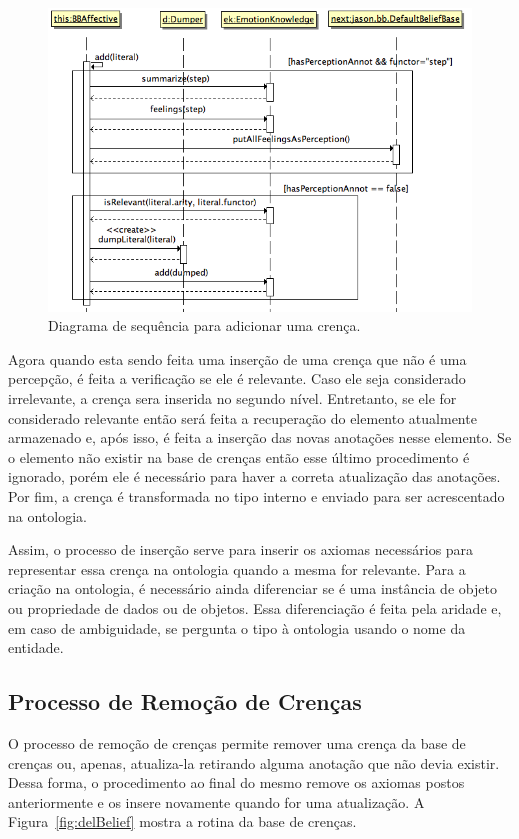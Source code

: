 \begin{figure}
  \centering
  \includegraphics[width=12cm]{figuras/addB.png}
  \caption{Diagrama de sequência para adicionar uma crença.}
  \label{fig:addBelief}
\end{figure}

Agora quando esta sendo feita uma inserção de uma crença que não é uma
percepção, é feita a verificação se ele é relevante. Caso ele seja considerado
irrelevante, a crença sera inserida no segundo nível. Entretanto, se ele for
considerado relevante então será feita a recuperação do elemento atualmente
armazenado e, após isso, é feita a inserção das novas anotações nesse
elemento. Se o elemento não existir na base de crenças então esse último
procedimento é ignorado, porém ele é necessário para haver a correta
atualização das anotações. Por fim, a crença é transformada no tipo interno e
enviado para ser acrescentado na ontologia.

Assim, o processo de inserção serve para inserir os axiomas necessários para
representar essa crença na ontologia quando a mesma for relevante. Para a
criação na ontologia, é necessário ainda diferenciar se é uma instância de
objeto ou propriedade de dados ou de objetos. Essa diferenciação é feita pela
aridade e, em caso de ambiguidade, se pergunta o tipo à ontologia usando o
nome da entidade.

\subsection{Processo de Remoção de Crenças}

O processo de remoção de crenças permite remover uma crença da base de crenças
ou, apenas, atualiza-la retirando alguma anotação que não devia existir. Dessa
forma, o procedimento ao final do mesmo remove os axiomas postos anteriormente
e os insere novamente quando for uma atualização. A Figura~\ref{fig:delBelief}
mostra a rotina da base de crenças.

